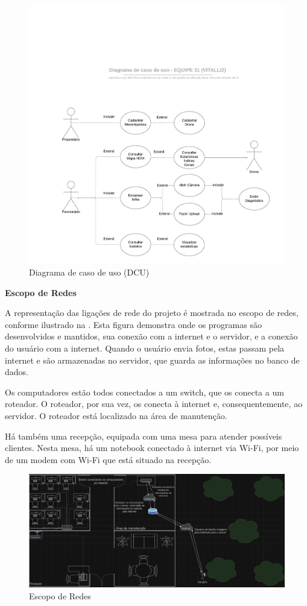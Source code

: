 \documentclass[
  a4paper,%
  12pt,%
  english,%
  brazilian,%
]{article}
\begin{document}
\begin{figure}[H]
\centering
\caption{Diagrama de caso de uso (DCU)}%
\label{fig:dcu}
\includegraphics[width=0.8\linewidth]{Logos/dcu.jpeg}
\end{figure}

\textbf{Escopo de Redes}

A representação das ligações de rede do projeto é mostrada no escopo de redes, conforme ilustrado na . Esta figura demonstra onde os programas são desenvolvidos e mantidos, sua conexão com a internet e o servidor, e a conexão do usuário com a internet. Quando o usuário envia fotos, estas passam pela internet e são armazenadas no servidor, que guarda as informações no banco de dados.

Os computadores estão todos conectados a um switch, que os conecta a um roteador. O roteador, por sua vez, os conecta à internet e, consequentemente, ao servidor. O roteador está localizado na área de manutenção.

Há também uma recepção, equipada com uma mesa para atender possíveis clientes. Nesta mesa, há um notebook conectado à internet via Wi-Fi, por meio de um modem com Wi-Fi que está situado na recepção.

\begin{figure}[H]
\centering
\caption{Escopo de Redes}%
\label{fig:escopoderedes}
\includegraphics[width=0.8\linewidth]{Logos/escopoderedes.png}
\end{figure}
\end{document}
